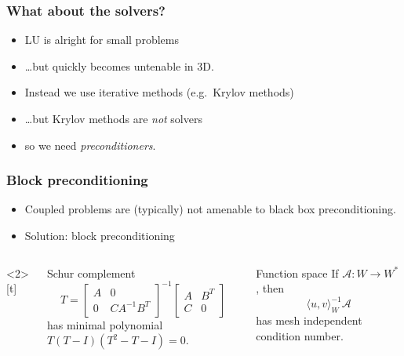 \documentclass[presentation,aspectratio=43]{beamer}
\begin{document}
\begin{frame}[t]
  \frametitle{What about the solvers?}
  \begin{itemize}
  \item LU is alright for small problems
  \item \dots but quickly becomes untenable in 3D.
  \item Instead we use iterative methods (e.g.~Krylov methods)
  \item<2-> \dots but Krylov methods are \emph{not} solvers
  \item<3-> so we need \emph{preconditioners}.
  \end{itemize}
\end{frame}
\begin{frame}
  \frametitle{Block preconditioning}
  \begin{itemize}
  \item Coupled problems are (typically) not amenable to black
    box preconditioning.
  \item<2-> Solution: block preconditioning
  \end{itemize}
  \begin{columns}<2>[t]
    \begin{column}{0.5\textwidth}
      \begin{block}{Schur complement}
        \begin{equation*}
          T = \begin{bmatrix}
            A & 0 \\
            0 & C A^{-1} B^T
          \end{bmatrix}^{-1}
          \begin{bmatrix}
            A & B^T \\
            C & 0
          \end{bmatrix}
        \end{equation*}
        has minimal polynomial $T(T - I)(T^2 - T - I) = 0$.
        \nocite{Murphy:2000,Ipsen:2001,Benzi:2005}
      \end{block}
    \end{column}
    \begin{column}{0.5\textwidth}
      \begin{block}{Function space}
        If $\mathcal{A} : W \rightarrow W^*$, then
        \begin{equation*}
          \langle u, v \rangle_W^{-1} \mathcal{A}
        \end{equation*}
        has mesh independent condition number.
        \nocite{Malek:2014,Mardal:2011,Kirby:2010}
      \end{block}
    \end{column}
  \end{columns}
\end{frame}
\end{document}
